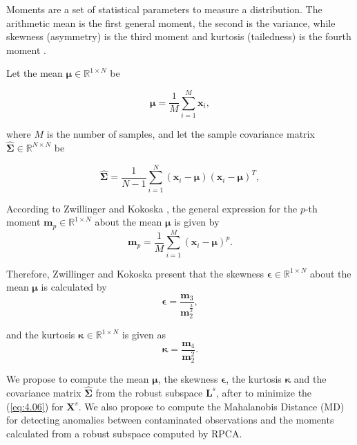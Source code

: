 Moments are a set of statistical parameters to measure a distribution. The arithmetic mean is the first general moment, the second is the variance, while skewness (asymmetry) is the third moment and kurtosis (tailedness) is the fourth moment \cite{reis2016audio}.

Let the mean $\pmb{\mu} \in \mathbb{R}^{1 \times N}$ be

\begin{equation}\label{eq:4.07}
	\pmb{\mu} = \displaystyle\frac{1}{M}\displaystyle\sum_{i = 1}^{M} \pmb{x}_i,
\end{equation}

where $M$ is the number of samples, and let the sample covariance matrix $\hat{\pmb{\Sigma}} \in \mathbb{R}^{N \times N}$ be

\begin{equation}\label{eq:4.08}
	\hat{\pmb{\Sigma}} = \displaystyle\frac{1}{N-1}\displaystyle\sum_{i = 1}^{N} (\pmb{x}_i - \pmb{\mu})(\pmb{x}_i - \pmb{\mu})^T,
\end{equation}

According to Zwillinger and Kokoska \cite{zwillinger1999crc}, the general expression for the $p$-th moment $\pmb{m}_p \in \mathbb{R}^{1 \times N}$ about the mean $\pmb{\mu}$ is given by
\begin{equation}\label{eq:4.09}
	\pmb{m}_p = \displaystyle\frac{1}{M}\displaystyle\sum_{i = 1}^{M}(\pmb{x}_i - \pmb{\mu})^p.
\end{equation}

Therefore, Zwillinger and Kokoska \cite{zwillinger1999crc} present that the skewness $\pmb{\epsilon} \in \mathbb{R}^{1 \times N}$ about the mean $\pmb{\mu}$ is calculated by
\begin{equation}\label{eq:4.10}
	\pmb{\epsilon} = \frac{\pmb{m}_3}{\pmb{m}_2^{\frac{3}{2}}},
\end{equation}

and the kurtosis $\pmb{\kappa} \in \mathbb{R}^{1 \times N}$ is given as
\begin{equation}\label{eq:4.11}
	\pmb{\kappa} = \frac{\pmb{m}_4}{\pmb{m}_2^2}.
\end{equation}

We propose to compute the mean $\pmb{\mu}$, the skewness $\pmb{\epsilon}$, the kurtosis $\pmb{\kappa}$ and the covariance matrix $\hat{\pmb{\Sigma}}$ from the robust subspace $\pmb{L}^s$, after to minimize the (\ref{eq:4.06}) for $\pmb{X}^s$. We also propose to compute the Mahalanobis Distance (MD) for detecting anomalies between contaminated observations and the moments calculated from a robust subspace computed by RPCA. 

